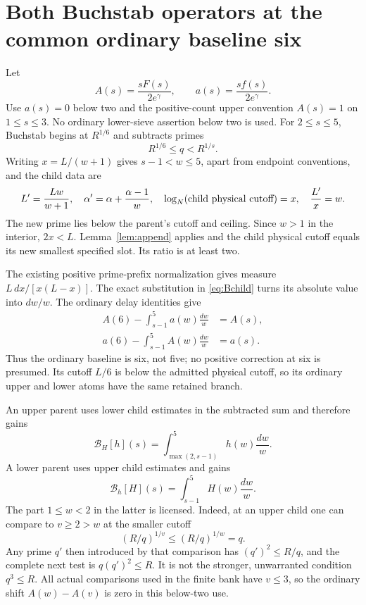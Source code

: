 \documentclass[11pt]{article}
\begin{document}
\section{Both Buchstab operators at the common ordinary baseline six}
Let
\[
 A(s)=\frac{sF(s)}{2e^\gamma},\qquad
 a(s)=\frac{sf(s)}{2e^\gamma}.
\]
Use $a(s)=0$ below two and the positive-count upper convention $A(s)=1$
on $1\le s\le3$. No ordinary lower-sieve assertion below two is used.
For $2\le s\le5$, Buchstab begins at $R^{1/6}$ and subtracts primes
\[
 R^{1/6}\le q<R^{1/s}.
\]
Writing $x=L/(w+1)$ gives $s-1<w\le5$, apart from endpoint conventions,
and the child data are
\begin{equation}\label{eq:Bchild}
 L'=\frac{Lw}{w+1},\quad
 \alpha'=\alpha+\frac{\alpha-1}{w},\quad
 \log_N(\hbox{child physical cutoff})=x,\quad
 \frac{L'}x=w.
\end{equation}
The new prime lies below the parent's cutoff and ceiling. Since $w>1$
in the interior, $2x<L$. Lemma~\ref{lem:append} applies and the child
physical cutoff equals its new smallest specified slot. Its ratio is
at least two.

The existing positive prime-prefix normalization gives measure
$L\,dx/[x(L-x)]$. The exact substitution in \eqref{eq:Bchild} turns
its absolute value into $dw/w$. The ordinary delay identities give
\begin{align*}
 A(6)-\int_{s-1}^{5}a(w)\frac{dw}{w}&=A(s),\\
 a(6)-\int_{s-1}^{5}A(w)\frac{dw}{w}&=a(s).
\end{align*}
Thus the ordinary baseline is six, not five; no positive correction at
six is presumed. Its cutoff $L/6$ is below the admitted physical cutoff,
so its ordinary upper and lower atoms have the same retained branch.

An upper parent uses lower child estimates in the subtracted sum and
therefore gains
\[
 \mathcal B_H[h](s)=\int_{\max(2,s-1)}^5h(w)\frac{dw}{w}.
\]
A lower parent uses upper child estimates and gains
\[
 \mathcal B_h[H](s)=\int_{s-1}^5H(w)\frac{dw}{w}.
\]
The part $1\le w<2$ in the latter is licensed. Indeed, at an upper
child one can compare to $v\ge2>w$ at the smaller cutoff
\[
       (R/q)^{1/v}\le(R/q)^{1/w}=q.
\]
Any prime $q'$ then introduced by that comparison has
$(q')^2\le R/q$, and the complete next test is
$q(q')^2\le R$. It is not the stronger, unwarranted condition $q^3\le R$.
All actual comparisons used in the finite bank have $v\le3$, so the
ordinary shift $A(w)-A(v)$ is zero in this below-two use.
\end{document}

